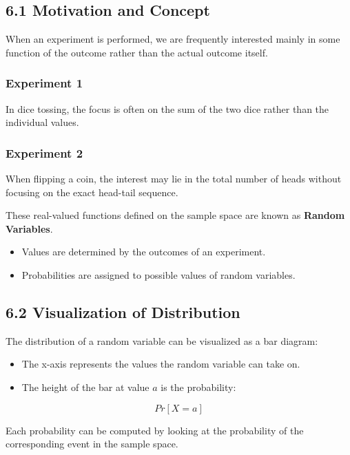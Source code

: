 \documentclass[12pt]{article}
\begin{document}
\subsection*{\textbf{6.1 Motivation and Concept}}

When an experiment is performed, we are frequently interested mainly in some function of the outcome rather than the actual outcome itself.

\subsubsection*{\textbf{Experiment 1}}

In dice tossing, the focus is often on the sum of the two dice rather than the individual values.

\subsubsection*{\textbf{Experiment 2}}

When flipping a coin, the interest may lie in the total number of heads without focusing on the exact head-tail sequence.

These real-valued functions defined on the sample space are known as \textbf{Random Variables}.

\begin{itemize}
    \item Values are determined by the outcomes of an experiment.
    \item Probabilities are assigned to possible values of random variables.
\end{itemize}

\subsection*{\textbf{6.2 Visualization of Distribution}}

The distribution of a random variable can be visualized as a bar diagram:

\begin{itemize}
    \item The x-axis represents the values the random variable can take on.
    \item The height of the bar at value $a$ is the probability:
\end{itemize}

\[
Pr[X = a]
\]

Each probability can be computed by looking at the probability of the corresponding event in the sample space.
\end{document}
